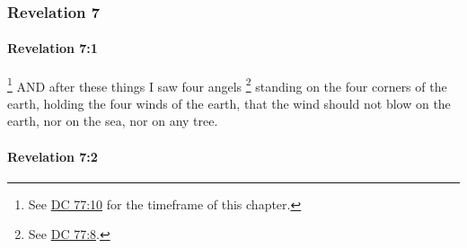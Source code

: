 	\subsubsection{Revelation 7} %
		\label{REVELATIONNT-7}
		
		\paragraph{Revelation 7:1} %
			\label{REVELATIONNT-7-1}

				\footnote{%
					See \hyperref[DC77-10]{DC 77:10} for the timeframe of this chapter.
					}%
			AND after these things I saw four angels%
				\footnote{%
					See \hyperref[DC77-8]{DC 77:8}.
					}
			standing on the four corners of the earth, holding the four winds of the earth, that the wind should not blow on the earth, nor on the sea, nor on any tree.

			\begin{framed}
			\scriptsize
				\begin{compactdesc}
					\item[SBLG] 
				\end{compactdesc}
			\end{framed}

		\paragraph{Revelation 7:2} %
			\label{REVELATIONNT-7-2}

